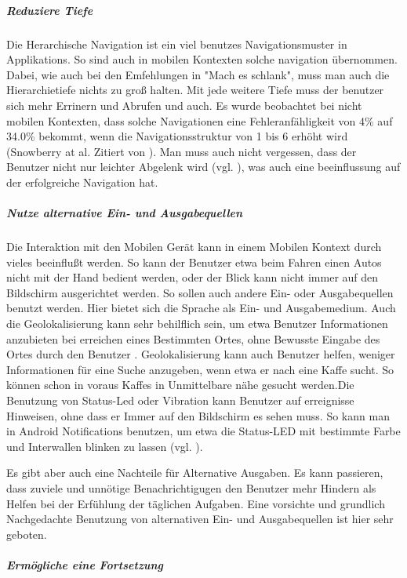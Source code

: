 \subparagraph{Reduziere Tiefe} 
\label{subp:reduziere_das_w_hlen}

Die Herarchische Navigation ist ein viel benutzes Navigationsmuster in Applikations. So sind auch in mobilen Kontexten solche navigation übernommen. Dabei, wie auch bei den Emfehlungen in "Mach es schlank", muss man auch die Hierarchietiefe nichts zu groß halten. Mit jede weitere Tiefe muss der benutzer sich mehr Errinern und Abrufen und auch. Es wurde beobachtet bei nicht mobilen Kontexten, dass solche Navigationen eine Fehleranfähligkeit von 4\% auf 34.0\% bekommt, wenn die Navigationsstruktur von 1 bis 6 erhöht wird (Snowberry at al. Zitiert von \cite{Chae:2004gp}). Man muss auch nicht vergessen, dass der Benutzer nicht nur leichter Abgelenk wird (vgl. \cite{Oulasvirta:2005vn}), was auch eine beeinflussung auf der erfolgreiche Navigation hat.

\subparagraph{Nutze alternative Ein- und Ausgabequellen}
\label{subp:nutze_alternative_eingabenger_ten}

Die Interaktion mit den Mobilen Gerät kann in einem Mobilen Kontext durch vieles beeinflußt werden. So kann der Benutzer etwa beim Fahren einen Autos nicht mit der Hand bedient werden, oder der Blick kann nicht immer auf den Bildschirm ausgerichtet werden. So sollen auch andere Ein- oder Ausgabequellen benutzt werden. Hier bietet sich die Sprache als Ein- und Ausgabemedium.
Auch die Geolokalisierung kann sehr behilflich sein, um etwa Benutzer Informationen anzubieten bei erreichen eines Bestimmten Ortes, ohne Bewusste Eingabe des Ortes durch den Benutzer . Geolokalisierung kann auch Benutzer helfen, weniger Informationen für eine Suche anzugeben, wenn etwa er nach eine Kaffe sucht. So können schon in voraus Kaffes in Unmittelbare nähe gesucht werden.Die Benutzung von Status-Led oder Vibration kann Benutzer auf erreignisse Hinweisen, ohne dass er Immer auf den Bildschirm es sehen muss. So kann man in Android Notifications benutzen, um etwa die Status-LED mit bestimmte Farbe und Interwallen blinken zu lassen (vgl. \cite{androidNotApi}).

Es gibt aber auch eine Nachteile für Alternative Ausgaben. Es kann passieren, dass zuviele und unnötige Benachrichtigugen den Benutzer mehr Hindern als Helfen bei der Erfühlung der täglichen Aufgaben. Eine vorsichte und grundlich Nachgedachte Benutzung von alternativen Ein- und Ausgabequellen ist hier sehr geboten.

\subparagraph{Ermögliche eine Fortsetzung}
\label{subp:erm_gliche_eine_fortsetzung}

